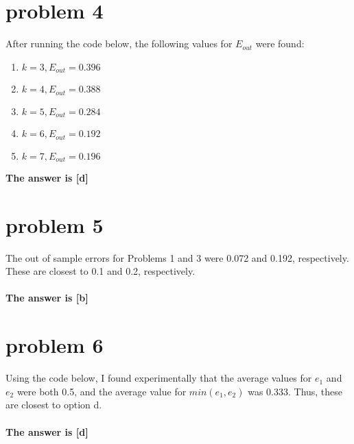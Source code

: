 \documentclass{article}
\begin{document}
\section*{problem 4}
After running the code below, the following values for $E_{out}$ were found:
\begin{enumerate}[label=(\alph*)]
    \item $k = 3, E_{out} = 0.396$
    \item $k = 4, E_{out} = 0.388$
    \item $k = 5, E_{out} = 0.284$
    \item $k = 6, E_{out} = 0.192$
    \item $k = 7, E_{out} = 0.196$
\end{enumerate}
\textbf{The answer is [d]}

\section*{problem 5}
The out of sample errors for Problems 1 and 3 were 0.072 and 0.192, respectively. These are closest to 0.1 and 0.2, respectively.\\\\
\textbf{The answer is [b]}

\section*{problem 6}
Using the code below, I found experimentally that the average values for $e_1$ and $e_2$ were both 0.5, and the average value for $min(e_1, e_2)$ was 0.333. Thus, these are closest to option d.\\\\
\textbf{The answer is [d]}
\end{document}
